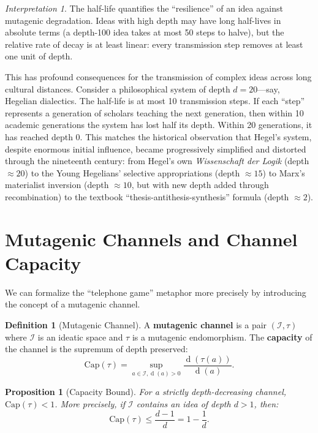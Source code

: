 \documentclass[11pt,openany]{book}
\theoremstyle{definition}
\newtheorem{definition}[axiom]{Definition}
\theoremstyle{plain}
\newtheorem{proposition}[axiom]{Proposition}
\theoremstyle{remark}
\newtheorem{interpretation}[axiom]{Interpretation}
\newcommand{\IS}{\mathcal{I}}               %
\newcommand{\depth}{\operatorname{d}}       %
\newcommand{\transmit}{\tau}                 %
\begin{document}
\begin{interpretation}
The half-life quantifies the ``resilience'' of an idea against mutagenic degradation. Ideas with high depth may have long half-lives in absolute terms (a depth-100 idea takes at most 50 steps to halve), but the relative rate of decay is at least linear: every transmission step removes at least one unit of depth.

This has profound consequences for the transmission of complex ideas across long cultural distances. Consider a philosophical system of depth $d = 20$---say, Hegelian dialectics. The half-life is at most 10 transmission steps. If each ``step'' represents a generation of scholars teaching the next generation, then within 10 academic generations the system has lost half its depth. Within 20 generations, it has reached depth 0. This matches the historical observation that Hegel's system, despite enormous initial influence, became progressively simplified and distorted through the nineteenth century: from Hegel's own \emph{Wissenschaft der Logik} (depth $\approx 20$) to the Young Hegelians' selective appropriations (depth $\approx 15$) to Marx's materialist inversion (depth $\approx 10$, but with new depth added through recombination) to the textbook ``thesis-antithesis-synthesis'' formula (depth $\approx 2$).
\end{interpretation}

\section{Mutagenic Channels and Channel Capacity}

We can formalize the ``telephone game'' metaphor more precisely by introducing the concept of a mutagenic channel.

\begin{definition}[Mutagenic Channel]
A \textbf{mutagenic channel} is a pair $(\IS, \transmit)$ where $\IS$ is an ideatic space and $\transmit$ is a mutagenic endomorphism. The \textbf{capacity} of the channel is the supremum of depth preserved:
\[
\mathrm{Cap}(\transmit) = \sup_{a \in \IS, \depth(a) > 0} \frac{\depth(\transmit(a))}{\depth(a)}.
\]
\end{definition}

\begin{proposition}[Capacity Bound]
For a strictly depth-decreasing channel, $\mathrm{Cap}(\transmit) < 1$. More precisely, if $\IS$ contains an idea of depth $d > 1$, then:
\[
\mathrm{Cap}(\transmit) \leq \frac{d-1}{d} = 1 - \frac{1}{d}.
\]
\end{proposition}
\end{document}
